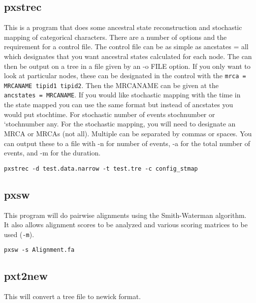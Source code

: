 \documentclass[12pt,letterpaper]{memoir}
\begin{document}
\subsection{pxstrec}

This is a program that does some ancestral state reconstruction and stochastic mapping of categorical characters. There are a number of options and the requirement for a control file. The control file can be as simple as ancstates = all which designates that you want ancestral states calculated for each node. The can then be output on a tree in a file given by an -o FILE option. If you only want to look at particular nodes, these can be designated in the control with the \texttt{mrca = MRCANAME tipid1 tipid2}. Then the MRCANAME can be given at the \texttt{ancstates = MRCANAME}. If you would like stochastic mapping with the time in the state mapped you can use the same format but instead of ancstates you would put stochtime. For stochastic number of events stochnumber or `stochnumber any. For the stochastic mapping, you will need to designate an MRCA or MRCAs (not all). Multiple can be separated by commas or spaces. You can output these to a file with -n for number of events, -a for the total number of events, and -m for the duration. 

\begin{flushleft}
\begin{verbatim}
pxstrec -d test.data.narrow -t test.tre -c config_stmap
\end{verbatim}
\end{flushleft}

\subsection{pxsw}

This program will do pairwise alignments using the Smith-Waterman algorithm. It also allows alignment scores to be analyzed and various scoring matrices to be used (\texttt{-m}).

\begin{flushleft}
\begin{verbatim}
pxsw -s Alignment.fa
\end{verbatim}
\end{flushleft}

\subsection{pxt2new}

This will convert a tree file to newick format.
\end{document}
